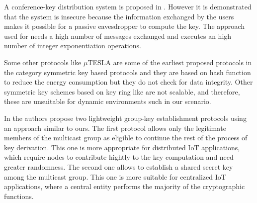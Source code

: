 A conference-key distribution system is proposed in \cite{Ingemarsson1982}. However it is demonstrated that the system is insecure because the information exchanged by the users makes it possible for a passive eavesdropper to compute the key. The approach used for \cite{Ingemarsson1982}  needs a high number of messages exchanged and executes an high number of integer exponentiation operations. %

Some other protocols like $\mu$TESLA \cite{Perrig2002} are some of the earliest proposed protocols in the category symmetric key based protocols and they are based on hash function to reduce the energy consumption but they do not check for data integrity. Other symmetric key schemes based on key ring like \cite{Bohli2007} are not scalable, and therefore, these are unsuitable for dynamic environments such in our scenario.

In \cite{Porambage2015} the authors propose two lightweight group-key establishment protocols using an approach similar to ours.
The first protocol allows only the legitimate members of the multicast group as eligible to continue the rest of the process of key derivation. 
This one is more appropriate for distributed IoT applications, which require nodes to contribute hightly to the key computation and need greater randomness. 
The second one allows to establish a shared secret key among the multicast group. This one is more suitable for centralized IoT applications, where a central entity performs the  majority of the cryptographic functions. 
